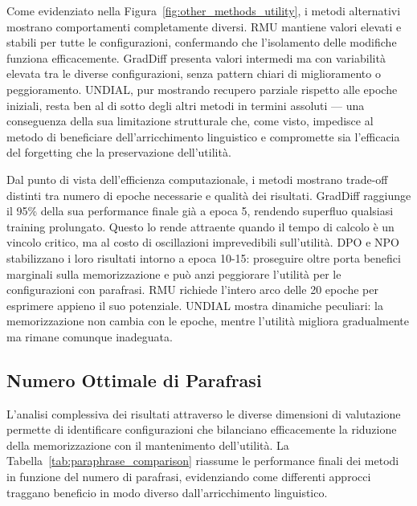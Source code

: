 Come evidenziato nella Figura~\ref{fig:other_methods_utility}, i metodi alternativi mostrano comportamenti completamente diversi. RMU mantiene valori elevati e stabili per tutte le configurazioni, confermando che l'isolamento delle modifiche funziona efficacemente. GradDiff presenta valori intermedi ma con variabilità elevata tra le diverse configurazioni, senza pattern chiari di miglioramento o peggioramento. UNDIAL, pur mostrando recupero parziale rispetto alle epoche iniziali, resta ben al di sotto degli altri metodi in termini assoluti — una conseguenza della sua limitazione strutturale che, come visto, impedisce al metodo di beneficiare dell'arricchimento linguistico e compromette sia l'efficacia del forgetting che la preservazione dell'utilità.

Dal punto di vista dell'efficienza computazionale, i metodi mostrano trade-off distinti tra numero di epoche necessarie e qualità dei risultati. GradDiff raggiunge il 95\% della sua performance finale già a epoca 5, rendendo superfluo qualsiasi training prolungato. Questo lo rende attraente quando il tempo di calcolo è un vincolo critico, ma al costo di oscillazioni imprevedibili sull'utilità. DPO e NPO stabilizzano i loro risultati intorno a epoca 10-15: proseguire oltre porta benefici marginali sulla memorizzazione e può anzi peggiorare l'utilità per le configurazioni con parafrasi. RMU richiede l'intero arco delle 20 epoche per esprimere appieno il suo potenziale. UNDIAL mostra dinamiche peculiari: la memorizzazione non cambia con le epoche, mentre l'utilità migliora gradualmente ma rimane comunque inadeguata.


\subsection{Numero Ottimale di Parafrasi}

L'analisi complessiva dei risultati attraverso le diverse dimensioni di valutazione permette di identificare configurazioni che bilanciano efficacemente la riduzione della memorizzazione con il mantenimento dell'utilità. La Tabella~\ref{tab:paraphrase_comparison} riassume le performance finali dei metodi in funzione del numero di parafrasi, evidenziando come differenti approcci traggano beneficio in modo diverso dall'arricchimento linguistico.

